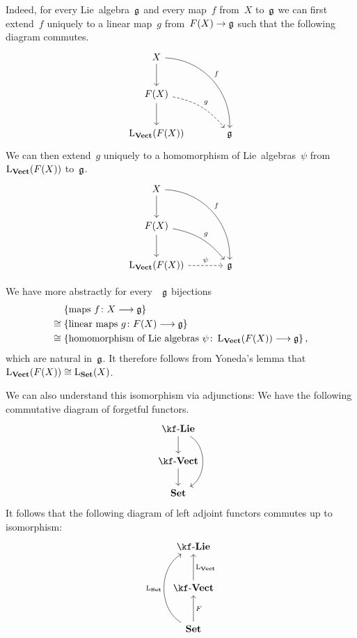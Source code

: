 \begin{remark}
\begin{enumerate}
			Indeed, for every Lie~algebra~$\mathfrak{g}$ and every map~$f$ from~$X$ to~$\mathfrak{g}$ we can first extend~$f$ uniquely to a linear map~$g$ from~$F(X) \to \glie$ such that the following diagram commutes.
			\[
				\begin{tikzcd}[column sep = large]
					X
					\arrow{d}
					\arrow[bend left = 45]{ddr}[above right]{f}
					&
					{}
					\\[0.5em]
					F(X)
					\arrow{d}
					\arrow[dashed, bend left = 20]{dr}[above right]{g}
					&
					{}
					\\[0.5em]
					\freelievect(F(X))
					&
					\glie
				\end{tikzcd}
			\]
			We can then extend~$g$ uniquely to a homomorphism of Lie~algebras~$\psi$ from~$\operatorname{L}_{\mathbf{Vect}}(F(X))$ to~$\mathfrak{g}$.
			\[
				\begin{tikzcd}[column sep = large]
					X
					\arrow{d}
					\arrow[bend left = 45]{ddr}[above right]{f}
					&
					{}
					\\[0.5em]
					F(X)
					\arrow{d}
					\arrow[bend left = 20]{dr}[above right]{g}
					&
					{}
					\\[0.5em]
					\freelievect(F(X))
					\arrow[dashed]{r}[above]{\psi}
					&
					\glie
				\end{tikzcd}
			\]

			We have more abstractly for every~\liealgebra{$\kf$}~$\mathfrak{g}$ bijections
			\begin{align*}
				{}&
				\{
					\text{maps~$f \colon X \to \glie$}
				\}
				\\
				\cong{}&
				\{
					\text{linear maps~$g \colon F(X) \to \glie$}
				\}
				\\
				\cong{}&
				\{
					\text{homomorphism of Lie~algebras~$\psi \colon \freelievect(F(X)) \to \glie$}
				\} \,,
			\end{align*}
			which are natural in~$\mathfrak{g}$.
			It therefore follows from Yoneda’s lemma that~$\operatorname{L}_{\mathbf{Vect}}(F(X)) \cong \operatorname{L}_{\mathbf{Set}}(X)$.

			We can also understand this isomorphism via adjunctions:
			We have the following commutative diagram of forgetful functors.
			\[
				\begin{tikzcd}
					\cLie{\kf}
					\arrow{d}
					\arrow[bend left = 60]{dd}
					\\
					\cVect{\kf}
					\arrow{d}
					\\
					\cSet
				\end{tikzcd}
			\]
			It follows that the following diagram of left adjoint functors commutes up to isomorphism:
			\[
				\begin{tikzcd}[row sep = large]
					\cLie{\kf}
					\\
					\cVect{\kf}
					\arrow{u}[right]{\freelievect}
					\\
					\cSet
					\arrow{u}[right]{F}
					\arrow[bend left = 60]{uu}[left]{\freelieset}
				\end{tikzcd}
			\]
	\end{enumerate}
\end{remark}


